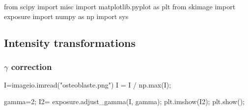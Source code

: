 \def\QRCODE{TB_image_TUT.IMG.image_enhancement_pythonqrcode.png}
\def\QRPAGE{http://www.iptutorials.science/tree/master/TB_image/TUT.IMG.image_enhancement/python}

\begin{python}
from scipy import misc
import matplotlib.pyplot as plt
from skimage import exposure
import numpy as np
import sys
\end{python}

\vspace*{-0.3cm}

\subsection{Intensity transformations}

\vspace*{-0.2cm}

\subsubsection{$\gamma$ correction}
\begin{python}
I=imageio.imread("osteoblaste.png")
I = I / np.max(I);

gamma=2;
I2= exposure.adjust_gamma(I, gamma);
plt.imshow(I2);
plt.show();
\end{python}

\vspace*{-0.3cm}

